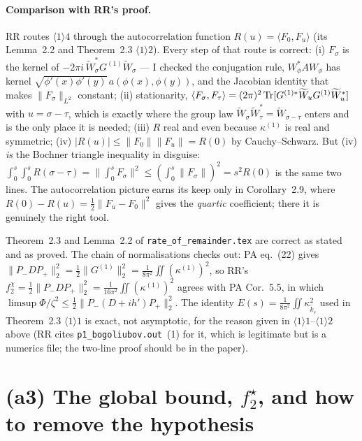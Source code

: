 \documentclass[11pt]{article}
\newcommand{\Wt}{\widetilde W}\newcommand{\kt}{\widetilde k}
\newcommand{\Pp}{P_+}\newcommand{\Pm}{P_-}\newcommand{\Om}{\Omega}\newcommand{\one}{\mathbf 1}
\newcommand{\norm}[1]{\lVert#1\rVert}\newcommand{\abs}[1]{\lvert#1\rvert}
\newcommand{\ip}[2]{\langle#1,#2\rangle}
\begin{document}
\paragraph{Comparison with RR's proof.}  RR routes $\langle1\rangle4$ through the autocorrelation
function $R(u)=\ip{F_0}{F_u}$ (its Lemma~2.2 and Theorem~2.3 $\langle1\rangle2$).  Every step of
that route is correct: (i) $F_\sigma$ is the kernel of $-2\pi i\,\Wt_\sigma^*G^{(1)}\Wt_\sigma$ ---
I checked the conjugation rule, $W_\phi^*AW_\phi$ has kernel
$\sqrt{\phi'(x)\phi'(y)}\,a(\phi(x),\phi(y))$, and the Jacobian identity that makes
$\norm{F_\sigma}_{L^2}$ constant; (ii) stationarity,
$\ip{F_\sigma}{F_\tau}=(2\pi)^2\Tr[G^{(1)*}\Wt_uG^{(1)}\Wt_u^*]$ with $u=\sigma-\tau$, which is
exactly where the group law $\Wt_\sigma\Wt_\tau^*=\Wt_{\sigma-\tau}$ enters and is the only place it
is needed; (iii) $R$ real and even because $\kappa^{(1)}$ is real and symmetric; (iv)
$\abs{R(u)}\le\norm{F_0}\norm{F_u}=R(0)$ by Cauchy--Schwarz.  But (iv) \emph{is} the Bochner
triangle inequality in disguise: $\int_0^s\!\int_0^sR(\sigma-\tau)=\norm{\int_0^sF_\sigma}^2\le
(\int_0^s\norm{F_\sigma})^2=s^2R(0)$ is the same two lines.  The autocorrelation picture earns its
keep only in Corollary~2.9, where $R(0)-R(u)=\frac12\norm{F_u-F_0}^2$ gives the \emph{quartic}
coefficient; there it is genuinely the right tool.

\begin{verdictok}
Theorem~2.3 and Lemma~2.2 of \texttt{rate\_of\_remainder.tex} are correct as stated and as proved.
The chain of normalisations checks out: PA eq.~(22) gives
$\norm{\Pm D\Pp}_2^2=\frac12\norm{G^{(1)}}_2^2=\frac1{8\pi^2}\iint(\kappa^{(1)})^2$, so RR's
$f_2^\chi=\frac12\norm{\Pm D\Pp}_2^2=\frac1{16\pi^2}\iint(\kappa^{(1)})^2$ agrees with PA
Cor.~5.5, in which $\limsup\Phi/\zeta^2\le\frac12\norm{\Pm(D+ih')\Pp}_2^2$.  The identity
$E(s)=\frac1{8\pi^2}\iint\kappa_{\kt_s}^2$ used in Theorem~2.3 $\langle1\rangle1$ is exact, not
asymptotic, for the reason given in $\langle1\rangle1$--$\langle1\rangle2$ above (RR cites
\texttt{p1\_bogoliubov.out}~(1) for it, which is legitimate but is a numerics file; the two-line
proof should be in the paper).
\end{verdictok}

\section{(a3) The global bound, $f_2^\star$, and how to remove the hypothesis}\label{sec:repair}
\end{document}
